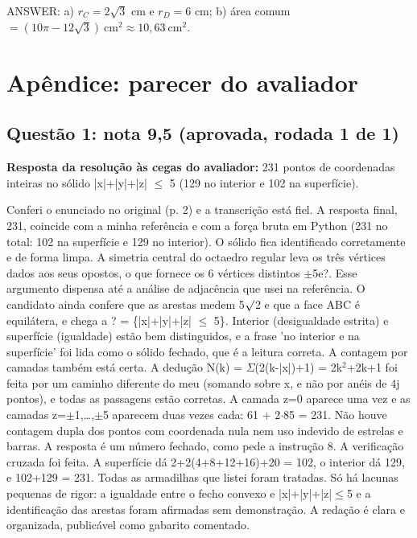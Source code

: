\documentclass{article}%
\begin{document}
\medskip
ANSWER: a) $r_C=2\sqrt3$ cm e $r_D=6$ cm; b) área comum $=(10\pi-12\sqrt3)\ \text{cm}^2\approx 10{,}63\ \text{cm}^2$.%
\newpage%
\section*{Apêndice: parecer do avaliador}%
\subsection*{Questão 1: nota 9,5 (aprovada, rodada 1 de 1)}%
\textbf{Resposta da resolução às cegas do avaliador:} 231 pontos de coordenadas inteiras no sólido |x|+|y|+|z| $\leq$ 5 (129 no interior e 102 na superfície).\par %
Conferi o enunciado no original (p. 2) e a transcrição está fiel. A resposta final, 231, coincide com a minha referência e com a força bruta em Python (231 no total: 102 na superfície e 129 no interior).\newline%
\newline%
O sólido fica identificado corretamente e de forma limpa. A simetria central do octaedro regular leva os três vértices dados aos seus opostos, o que fornece os 6 vértices distintos $\pm$5e?. Esse argumento dispensa até a análise de adjacência que usei na referência. O candidato ainda confere que as arestas medem 5$\surd$2 e que a face ABC é equilátera, e chega a ? = \{|x|+|y|+|z| $\leq$ 5\}. Interior (desigualdade estrita) e superfície (igualdade) estão bem distinguidos, e a frase 'no interior e na superfície' foi lida como o sólido fechado, que é a leitura correta.\newline%
\newline%
A contagem por camadas também está certa. A dedução N(k) = $\Sigma$(2(k-|x|)+1) = 2k$^2$+2k+1 foi feita por um caminho diferente do meu (somando sobre x, e não por anéis de 4j pontos), e todas as passagens estão corretas. A camada z=0 aparece uma vez e as camadas z=$\pm$1,\ldots{},$\pm$5 aparecem duas vezes cada: 61 + 2$\cdot$85 = 231. Não houve contagem dupla dos pontos com coordenada nula nem uso indevido de estrelas e barras. A resposta é um número fechado, como pede a instrução 8.\newline%
\newline%
A verificação cruzada foi feita. A superfície dá 2+2(4+8+12+16)+20 = 102, o interior dá 129, e 102+129 = 231. Todas as armadilhas que listei foram tratadas.\newline%
\newline%
Só há lacunas pequenas de rigor: a igualdade entre o fecho convexo e |x|+|y|+|z|$\leq$5 e a identificação das arestas foram afirmadas sem demonstração. A redação é clara e organizada, publicável como gabarito comentado.%
\end{document}
